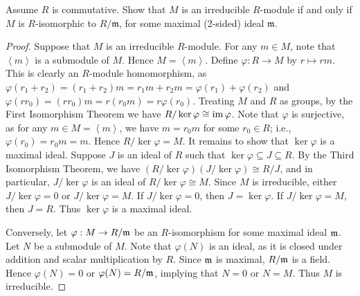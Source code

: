 \documentclass[10pt,oneside,openany]{memoir}
\begin{document}
\begin{exercise}
	Assume $R$ is commutative. Show that $M$ is an irreducible $R$-module if and only if $M$ is $R$-isomorphic to $R/\mathfrak m$, for some maximal (2-sided) ideal $\mathfrak m$.
\end{exercise}
{\color{blue}

	\begin{proof}
		Suppose that $M$ is an irreducible $R$-module. For any $m \in M$, note that $\left< m\right>$ is a submodule of $M$. Hence $M = \left<m \right>$. Define $\varphi:R \rightarrow M$ by $r \mapsto rm$. This is clearly an $R$-module homomorphism, as $\varphi(r_1 + r_2) = (r_1 + r_2)m = r_1m + r_2m = \varphi(r_1) + \varphi(r_2)$ and $\varphi(r r_0) = (r r_0)m = r (r_0 m) = r \varphi(r_0).$ Treating $M$ and $R$ as groups, by the First Isomorphism Theorem we have $R/\ker\varphi \cong \operatorname{im} \varphi$. Note that $\varphi$ is surjective, as for any $m \in M = \left<m \right>$, we have $m = r_0m$ for some $r_0 \in R$; i.e., $\varphi(r_0) = r_0m = m$. Hence $R/\ker\varphi = M$. It remains to show that $\ker \varphi$ is a maximal ideal. Suppose $J$ is an ideal of $R$ such that $\ker\varphi \subseteq J \subseteq R$. By the Third Isomorphism Theorem, we have $(R/\ker\varphi) (J/\ker\varphi) \cong R/J$, and in particular, $J/\ker\varphi$ is an ideal of $R/\ker\varphi \cong M$. Since $M$ is irreducible, either $J/\ker\varphi = 0$ or $J/\ker\varphi = M$. If $J/\ker\varphi = 0$, then $J = \ker\varphi$. If $J/\ker\varphi = M$, then $J = R$. Thus $\ker\varphi$ is a maximal ideal.

		Conversely, let $\varphi: M \rightarrow R/\mathfrak{m}$ be an $R$-isomorphism for some maximal ideal $\mathfrak{m}$. Let $N$ be a submodule of $M$. Note that $\varphi(N)$ is an ideal, as it is closed under addition and scalar multiplication by $R$. Since $\mathfrak{m}$ is maximal, $R/\mathfrak{m}$ is a field. Hence $\varphi(N)=  0$ or $\varphi(N) = R/\mathfrak{m}$, implying that $N = 0$ or $N = M$. Thus $M$ is irreducible.
	\end{proof}
}
\end{document}
